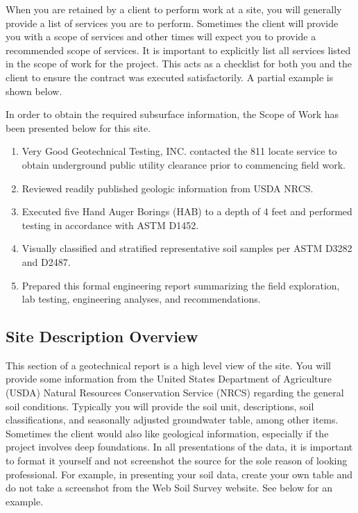 \documentclass[12pt]{article}
\begin{document}
When you are retained by a client to perform work at a site, you will generally provide a list of services you are to perform. Sometimes the client will provide you with a scope of services and other times will expect you to provide a recommended scope of services. It is important to explicitly list all services listed in the scope of work for the project. This acts as a checklist for both you and the client to ensure the contract was executed satisfactorily. A partial example is shown below.

\begin{letter}
In order to obtain the required subsurface information, the Scope of Work has been presented below for this site.
\begin{enumerate}
    \item Very Good Geotechnical Testing, INC. contacted the 811 locate service to obtain underground public utility clearance prior to commencing field work.
    \item Reviewed readily published geologic information from USDA NRCS.
    \item Executed five Hand Auger Borings (HAB) to a depth of 4 feet and performed testing in accordance with ASTM D1452.
    \item Visually classified and stratified representative soil samples per ASTM D3282 and D2487.
    \item Prepared this formal engineering report summarizing the field exploration, lab testing, engineering analyses, and recommendations.
\end{enumerate}
\end{letter}

\pagebreak
\subsection{Site Description Overview}
This section of a geotechnical report is a high level view of the site. You will provide some information from the United States Department of Agriculture (USDA) Natural Resources Conservation Service (NRCS) regarding the general soil conditions. Typically you will provide the soil unit, descriptions, soil classifications, and seasonally adjusted groundwater table, among other items. Sometimes the client would also like geological information, especially if the project involves deep foundations. In all presentations of the data, it is important to format it yourself and not screenshot the source for the sole reason of looking professional. For example, in presenting your soil data, create your own table and do not take a screenshot from the Web Soil Survey website. See below for an example.
\end{document}
